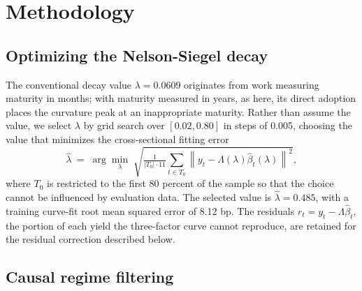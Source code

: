 \documentclass[10pt]{article}
\begin{document}
\section{Methodology}

\subsection{Optimizing the Nelson-Siegel decay}

The conventional decay value $\lambda = 0.0609$ originates from work measuring maturity in months; with maturity measured in years, as here, its direct adoption places the curvature peak at an inappropriate maturity. Rather than assume the value, we select $\lambda$ by grid search over $[0.02, 0.80]$ in steps of 0.005, choosing the value that minimizes the cross-sectional fitting error
\begin{equation}
\hat{\lambda} \;=\; \arg\min_{\lambda} \; \sqrt{\tfrac{1}{|T_0| \cdot 11} \textstyle\sum_{t \in T_0} \left\| y_t - \Lambda(\lambda)\hat{\beta}_t(\lambda) \right\|^2 },
\label{eq:decay}
\end{equation}
where $T_0$ is restricted to the first 80 percent of the sample so that the choice cannot be influenced by evaluation data. The selected value is $\hat{\lambda} = 0.485$, with a training curve-fit root mean squared error of 8.12 bp. The residuals $r_t = y_t - \Lambda \hat{\beta}_t$, the portion of each yield the three-factor curve cannot reproduce, are retained for the residual correction described below.

\subsection{Causal regime filtering}
\end{document}
